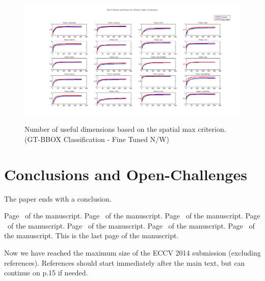\documentclass[runningheads]{llncs}
\begin{document}
\begin{figure}
\centering
\includegraphics[height=6.5cm]{images//pool5_bbox_seldims.jpeg}
\caption{Number of useful dimensions based on the spatial max criterion. (GT-BBOX Classification - Fine Tuned N/W)}
\label{fig:example}
\end{figure}










\section{Conclusions and Open-Challenges}

The paper ends with a conclusion. 


\clearpage\mbox{}Page \thepage\ of the manuscript.
\clearpage\mbox{}Page \thepage\ of the manuscript.
\clearpage\mbox{}Page \thepage\ of the manuscript.
\clearpage\mbox{}Page \thepage\ of the manuscript.
\clearpage\mbox{}Page \thepage\ of the manuscript.
\clearpage\mbox{}Page \thepage\ of the manuscript.
\clearpage\mbox{}Page \thepage\ of the manuscript.
This is the last page of the manuscript.
\par\vfill\par
Now we have reached the maximum size of the ECCV 2014 submission (excluding references).
References should start immediately after the main text, but can continue on p.15 if needed.

\clearpage



\end{document}

